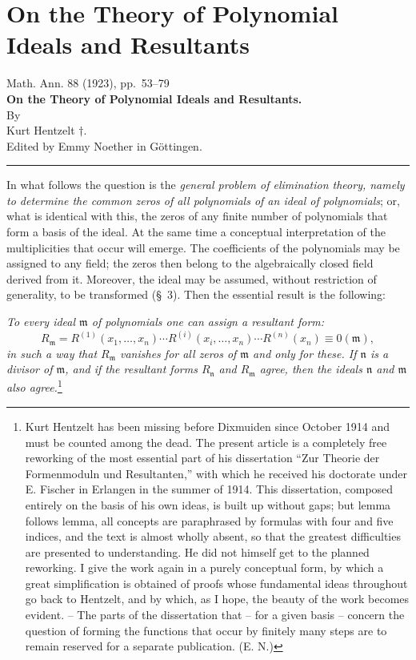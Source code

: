 \documentclass[11pt]{article}
\providecommand{\mideal}{\mathfrak m}
\providecommand{\nideal}{\mathfrak n}
\providecommand{\zero}[1]{\equiv 0(#1)}
\providecommand{\mideal}{\mathfrak m}
\providecommand{\nideal}{\mathfrak n}
\providecommand{\zero}[1]{\equiv 0\pmod{#1}}
\begin{document}
\section*{On the Theory of Polynomial Ideals and Resultants}
\begin{center}
Math. Ann. 88 (1923), pp.~53--79\\[0.9em]
{\Large\bfseries On the Theory of Polynomial Ideals and Resultants.}\\[1.0em]
By\\[0.45em]
Kurt Hentzelt \(\dagger\).\\[0.8em]
Edited by Emmy Noether in Göttingen.\\[0.6em]
\rule{4em}{0.4pt}
\end{center}

In what follows the question is the \emph{general problem of elimination theory, namely to determine the common zeros of all polynomials of an ideal of polynomials}; or, what is identical with this, the zeros of any finite number of polynomials that form a basis of the ideal. At the same time a conceptual interpretation of the multiplicities that occur will emerge. The coefficients of the polynomials may be assigned to any field; the zeros then belong to the algebraically closed field derived from it. Moreover, the ideal may be assumed, without restriction of generality, to be transformed (§~3). Then the essential result is the following:

\emph{To every ideal $\mideal$ of polynomials one can assign a resultant form:}
\[
 R_{\mideal}=R^{(1)}(x_1,\ldots,x_n)\cdots
 R^{(i)}(x_i,\ldots,x_n)\cdots R^{(n)}(x_n)\zero{\mideal},
\]
\emph{in such a way that $R_{\mideal}$ vanishes for all zeros of $\mideal$ and only for these. If $\nideal$ is a divisor of $\mideal$, and if the resultant forms $R_{\nideal}$ and $R_{\mideal}$ agree, then the ideals $\nideal$ and $\mideal$ also agree.}\footnote{Kurt Hentzelt has been missing before Dixmuiden since October 1914 and must be counted among the dead. The present article is a completely free reworking of the most essential part of his dissertation ``Zur Theorie der Formenmoduln und Resultanten,'' with which he received his doctorate under E. Fischer in Erlangen in the summer of 1914. This dissertation, composed entirely on the basis of his own ideas, is built up without gaps; but lemma follows lemma, all concepts are paraphrased by formulas with four and five indices, and the text is almost wholly absent, so that the greatest difficulties are presented to understanding. He did not himself get to the planned reworking. I give the work again in a purely conceptual form, by which a great simplification is obtained of proofs whose fundamental ideas throughout go back to Hentzelt, and by which, as I hope, the beauty of the work becomes evident. -- The parts of the dissertation that -- for a given basis -- concern the question of forming the functions that occur by finitely many steps are to remain reserved for a separate publication. (E. N.)}
\end{document}
